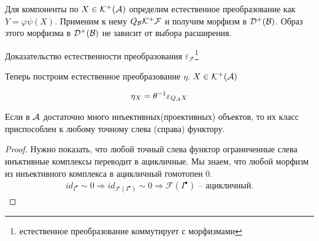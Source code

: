 \documentclass[../hw_main.tex]{subfiles}
\begin{document}
Для компоненты по $X \in \mathcal{K^+(A)}$ определим естественное преобразование как  $Y = \varphi\psi (X)$. Применим к нему $Q_{\mathcal{B}}\mathcal{K^+ F}$ и получим морфизм в $\mathcal{D^+(B)}$. Образ этого морфизма в $\mathcal{D^+(B)}$ не зависит от выбора расширения.
\bee
{}
\eee
Доказательство естественности преобразования $\varepsilon_{\mathcal{F}}$\footnote{естественное преобразование коммутирует с морфизмами}
\bee
{}
\eee
\bee
{}
\eee
Теперь построим естественное преобразование $\eta$. $X\in\mathcal{K^+(A)}$
\bee
{}    
 \eee
 \begin{align*}
     \eta_{X} = \theta^{-1}\varepsilon_{Q_{\mathcal{A}}X}
 \end{align*}
 \begin{to_claim}
Если в $\mathcal{A}$ достаточно много инъективных(проективных) объектов, то их класс приспособлен к любому точному слева (справа) функтору.
 \end{to_claim}
 \begin{proof}
 Нужно показать, что любой точный слева функтор ограниченные слева инъктивные комплексы переводит в ацикличные. Мы знаем, что любой морфизм из инъективного комплекса в ацикличный гомотопен 0. 
 \begin{align*}
     id_{I^\bullet} \sim 0 \Rightarrow id_{\mathcal{F}(I^\bullet)}\sim 0 \Rightarrow \mathcal{F}(I^\bullet) \text{ -- ацикличный.}
 \end{align*}
 \end{proof}
\end{document}
